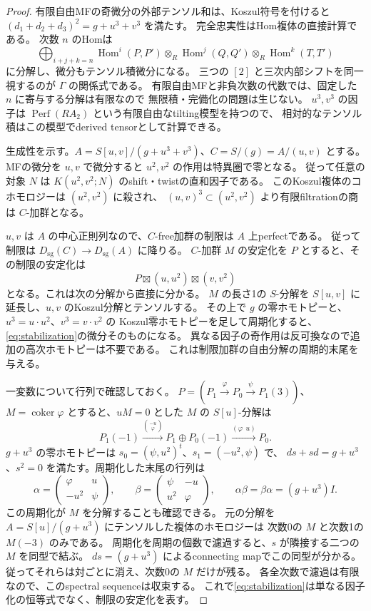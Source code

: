 \documentclass[a4paper,11pt]{ltjsarticle}
\theoremstyle{definition}
\newcommand{\Perf}{\operatorname{Perf}}
\newcommand{\Dsg}{D_{\mathrm{sg}}}
\begin{document}
\begin{proof}
有限自由MFの奇微分の外部テンソル和は、Koszul符号を付けると
$(d_1+d_2+d_3)^2=g+u^3+v^3$ を満たす。
完全忠実性はHom複体の直接計算である。
次数 $n$ のHomは
\[
 \bigoplus_{i+j+k=n}
 \operatorname{Hom}^i(P,P')\otimes_R
 \operatorname{Hom}^j(Q,Q')\otimes_R
 \operatorname{Hom}^k(T,T')
\]
に分解し、微分もテンソル積微分になる。
三つの $[2]$ と三次内部シフトを同一視するのが $\Gamma$ の関係式である。
有限自由MFと非負次数の代数では、固定した $n$ に寄与する分解は有限なので
無限積・完備化の問題は生じない。
$u^3,v^3$ の因子は $\Perf(RA_2)$ という有限自由なtilting模型を持つので、
相対的なテンソル積はこの模型でderived tensorとして計算できる。

生成性を示す。$A=S[u,v]/(g+u^3+v^3)$、$C=S/(g)=A/(u,v)$ とする。
MFの微分を $u,v$ で微分すると $u^2,v^2$ の作用は特異圏で零となる。
従って任意の対象 $N$ は $K(u^2,v^2;N)$ のshift・twistの直和因子である。
このKoszul複体のコホモロジーは $(u^2,v^2)$ に殺され、
$(u,v)^3\subset(u^2,v^2)$ より有限filtrationの商は $C$-加群となる。

$u,v$ は $A$ の中心正則列なので、$C$-free加群の制限は $A$ 上perfectである。
従って制限は $\Dsg(C)\to\Dsg(A)$ に降りる。
$C$-加群 $M$ の安定化を $P$ とすると、その制限の安定化は
\begin{equation}\label{eq:stabilization}
 P\boxtimes(u,u^2)\boxtimes(v,v^2)
\end{equation}
となる。これは次の分解から直接に分かる。
$M$ の長さ1の $S$-分解を $S[u,v]$ に延長し、$u,v$ のKoszul分解とテンソルする。
その上で $g$ の零ホモトピーと、$u^3=u\cdot u^2$、$v^3=v\cdot v^2$ の
Koszul零ホモトピーを足して周期化すると、\eqref{eq:stabilization}の微分そのものになる。
異なる因子の奇作用は反可換なので追加の高次ホモトピーは不要である。
これは制限加群の自由分解の周期的末尾を与える。

一変数について行列で確認しておく。
$P=(P_1\xrightarrow\varphi P_0\xrightarrow\psi P_1(3))$、$M=\operatorname{coker}\varphi$
とすると、$uM=0$ とした $M$ の $S[u]$-分解は
\[
 P_1(-1)\xrightarrow{\binom{-u}{\varphi}}
 P_1\oplus P_0(-1)\xrightarrow{(\varphi\ \ u)}P_0.
\]
$g+u^3$ の零ホモトピーは $s_0=(\psi,u^2)^t$、$s_1=(-u^2,\psi)$ で、
$ds+sd=g+u^3$、$s^2=0$ を満たす。周期化した末尾の行列は
\[
 \alpha=\begin{pmatrix}\varphi&u\\-u^2&\psi\end{pmatrix},
 \qquad
 \beta=\begin{pmatrix}\psi&-u\\u^2&\varphi\end{pmatrix},
 \qquad \alpha\beta=\beta\alpha=(g+u^3)I.
\]
この周期化が $M$ を分解することも確認できる。
元の分解を $A=S[u]/(g+u^3)$ にテンソルした複体のホモロジーは
次数0の $M$ と次数1の $M(-3)$ のみである。
周期化を周期の個数で濾過すると、$s$ が隣接する二つの $M$ を同型で結ぶ。
$ds=(g+u^3)$ によるconnecting mapでこの同型が分かる。
従ってそれらは対ごとに消え、次数0の $M$ だけが残る。
各全次数で濾過は有限なので、このspectral sequenceは収束する。
これで\eqref{eq:stabilization}は単なる因子化の恒等式でなく、制限の安定化を表す。


\end{proof}
\end{document}

